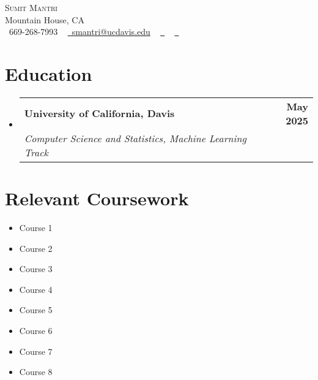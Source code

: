 \documentclass[letterpaper,11pt]{article}
\makeatletter
\newcommand{\resumeSubheading}[4]{
  \vspace{-2pt}\item
  \begin{tabular*}{1.0\textwidth}[t]{l@{\extracolsep{\fill}}r}
    \textbf{#1} & \textbf{\small #2} \\
    \textit{\small#3} & \textit{\small #4} \\
  \end{tabular*}\vspace{-7pt}
}
\newcommand{\resumeSubHeadingListStart}{\begin{itemize}[leftmargin=0.0in, label={}]}
\newcommand{\resumeSubHeadingListEnd}{\end{itemize}}
\makeatother
\begin{document}
\begin{center}
    {\Huge \scshape Sumit Mantri} \\ \vspace{1pt}
    Mountain House, CA \\ \vspace{1pt}
    \small \raisebox{-0.1\height}\faPhone\ 669-268-7993 ~ 
    \href{mailto:smantri@ucdavis.edu}{\raisebox{-0.2\height}\faEnvelope\ smantri@ucdavis.edu} ~
    \href{https://linkedin.com/in/}{\raisebox{-0.2\height}\faLinkedin\ } ~
    \href{}{\raisebox{-0.2\height}\faGithub\ }
\end{center}

\section{Education}
\resumeSubHeadingListStart
  \resumeSubheading
    {University of California, Davis}{May 2025}
    {Computer Science and Statistics, Machine Learning Track}{}
\resumeSubHeadingListEnd

\section{Relevant Coursework}
\begin{multicols}{4}
    \begin{itemize}[itemsep=-5pt, parsep=3pt]
        \item Course 1
        \item Course 2
        \item Course 3
        \item Course 4
        \item Course 5
        \item Course 6
        \item Course 7
        \item Course 8
    \end{itemize}
\end{multicols}

\end{document}
